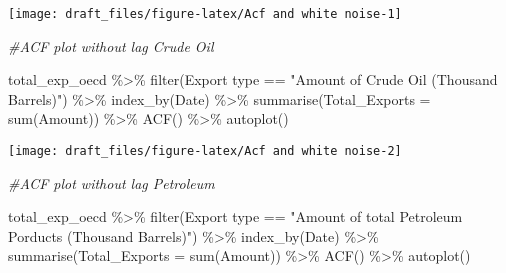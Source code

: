 \documentclass[
]{article}
\newenvironment{Shaded}{\begin{snugshade}}{\end{snugshade}}
\newcommand{\AttributeTok}[1]{\textcolor[rgb]{0.77,0.63,0.00}{#1}}
\newcommand{\CommentTok}[1]{\textcolor[rgb]{0.56,0.35,0.01}{\textit{#1}}}
\newcommand{\FunctionTok}[1]{\textcolor[rgb]{0.00,0.00,0.00}{#1}}
\newcommand{\NormalTok}[1]{#1}
\newcommand{\SpecialCharTok}[1]{\textcolor[rgb]{0.00,0.00,0.00}{#1}}
\newcommand{\StringTok}[1]{\textcolor[rgb]{0.31,0.60,0.02}{#1}}
\begin{document}
\begin{center}\texttt{[image: draft\_files/figure-latex/Acf and white noise-1]} \end{center}

\begin{Shaded}
\begin{Highlighting}[]
\CommentTok{\#ACF plot without lag Crude Oil}

\NormalTok{total\_exp\_oecd }\SpecialCharTok{\%\textgreater{}\%} \FunctionTok{filter}\NormalTok{(}\StringTok{\textasciigrave{}}\AttributeTok{Export type}\StringTok{\textasciigrave{}} \SpecialCharTok{==} \StringTok{"Amount of Crude Oil (Thousand Barrels)"}\NormalTok{) }\SpecialCharTok{\%\textgreater{}\%} 
  \FunctionTok{index\_by}\NormalTok{(Date) }\SpecialCharTok{\%\textgreater{}\%} 
  \FunctionTok{summarise}\NormalTok{(}\AttributeTok{Total\_Exports =} \FunctionTok{sum}\NormalTok{(}\StringTok{\textasciigrave{}}\AttributeTok{Amount}\StringTok{\textasciigrave{}}\NormalTok{)) }\SpecialCharTok{\%\textgreater{}\%} 
  \FunctionTok{ACF}\NormalTok{() }\SpecialCharTok{\%\textgreater{}\%}  \FunctionTok{autoplot}\NormalTok{()}
\end{Highlighting}
\end{Shaded}

\begin{center}\texttt{[image: draft\_files/figure-latex/Acf and white noise-2]} \end{center}

\begin{Shaded}
\begin{Highlighting}[]
\CommentTok{\#ACF plot without lag Petroleum}

\NormalTok{total\_exp\_oecd }\SpecialCharTok{\%\textgreater{}\%} \FunctionTok{filter}\NormalTok{(}\StringTok{\textasciigrave{}}\AttributeTok{Export type}\StringTok{\textasciigrave{}} \SpecialCharTok{==} \StringTok{"Amount of total Petroleum Porducts (Thousand Barrels)"}\NormalTok{) }\SpecialCharTok{\%\textgreater{}\%} 
  \FunctionTok{index\_by}\NormalTok{(Date) }\SpecialCharTok{\%\textgreater{}\%} 
  \FunctionTok{summarise}\NormalTok{(}\AttributeTok{Total\_Exports =} \FunctionTok{sum}\NormalTok{(}\StringTok{\textasciigrave{}}\AttributeTok{Amount}\StringTok{\textasciigrave{}}\NormalTok{)) }\SpecialCharTok{\%\textgreater{}\%} 
  \FunctionTok{ACF}\NormalTok{() }\SpecialCharTok{\%\textgreater{}\%}  \FunctionTok{autoplot}\NormalTok{()}
\end{Highlighting}
\end{Shaded}
\end{document}
